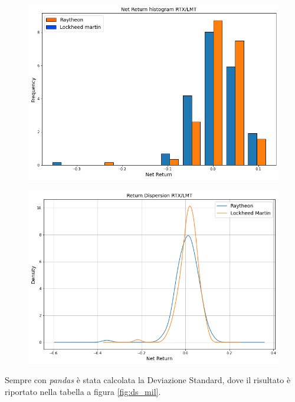 \documentclass{article}
\begin{document}
\begin{figure}[h]
  \centering
  \begin{minipage}{.5\textwidth}
    \centering
    \includegraphics[width=1\linewidth]{net_ret_mil_hist.png}
    \label{fig:isto_rendimenti_mil}
  \end{minipage}%
  \begin{minipage}{.5\textwidth}
    \centering
    \includegraphics[width=1\linewidth]{dispersione_mil.png}
    \label{fig:dispersione_mil}
  \end{minipage}
\end{figure}

Sempre con \emph{pandas} è stata calcolata la Deviazione Standard, dove il risultato è riportato nella tabella a figura \ref{fig:ds_mil}.
\end{document}
